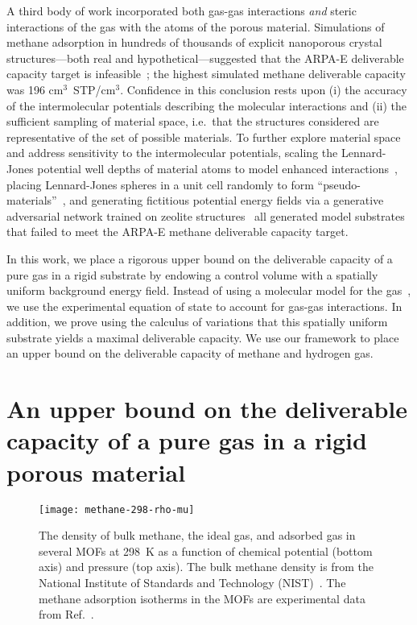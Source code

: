 A third body of work incorporated both gas-gas interactions \emph{and} steric
interactions of the gas with the atoms of the porous material. Simulations of
methane adsorption in hundreds of thousands of explicit nanoporous crystal
structures---both real and hypothetical---suggested that the ARPA-E deliverable
capacity target is infeasible~\cite{simon2015materials}; the highest simulated
methane deliverable capacity was 196 cm$^3$~STP/cm$^3$. Confidence in this
conclusion rests upon (i) the accuracy of the intermolecular potentials
describing the molecular interactions and (ii) the sufficient sampling of
material space, i.e.\ that the structures considered are representative of the
set of possible materials. To further explore material space and address
sensitivity to the intermolecular potentials, scaling the Lennard-Jones
potential well depths of material atoms to model enhanced
interactions~\cite{gomez2014exploring}, placing Lennard-Jones spheres in a unit
cell randomly to form ``pseudo-materials''~\cite{kaija2018high}, and generating
fictitious potential energy fields via a generative adversarial network trained
on zeolite structures~\cite{lee2019predicting} all generated model substrates
that failed to meet the ARPA-E methane deliverable capacity target.


In this work, we place a rigorous upper bound on the deliverable capacity of a
pure gas in a rigid substrate by endowing a control volume with a spatially
uniform background energy field. Instead of using a molecular model for the
gas~\cite{gomez2017impact}, we use the experimental equation of state to
account for gas-gas interactions. In addition, we prove using the calculus of
variations that this spatially uniform substrate yields a maximal deliverable
capacity. We use our framework to place an upper bound on the deliverable
capacity of methane and hydrogen gas.

\section{An upper bound on the deliverable capacity of a pure gas in a rigid porous material}\label{sec:upper-bound}
\begin{figure}
  \centering
  \texttt{[image: methane-298-rho-mu]}
  \caption{The density of bulk methane, the ideal gas, and adsorbed gas in several MOFs at 298\ K as a function of chemical potential (bottom axis) and pressure (top axis). The bulk methane density is from the National Institute of Standards and Technology (NIST)~\cite{nist}. The methane adsorption isotherms in the MOFs are experimental data from Ref.~\cite{mason2014evaluating, furukawa2009storage}.
  }
  \label{fig:density-vs-mu-ch4}
\end{figure}

